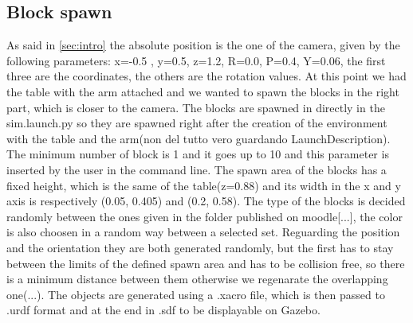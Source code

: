 \documentclass[12pt,a4paper]{article}
\begin{document}
\subsection{Block spawn}\label{subsec:blockspawn}
As said in \ref{sec:intro} the absolute position is the one of the camera, given by the following parameters: x=-0.5 , y=0.5, z=1.2, R=0.0, P=0.4, Y=0.06, the first three are the coordinates, the others are the rotation values. At this point we had the table with the arm attached and we wanted to spawn the blocks in the right part, which is closer to the camera. The blocks are spawned in directly in the sim.launch.py so they are spawned right after the creation of the environment with the table and the arm(non del tutto vero guardando LaunchDescription). The minimum number of block is 1 and it goes up to 10 and this parameter is inserted by the user in the command line. The spawn area of the blocks has a fixed height, which is the same of the table(z=0.88) and its width in the x and y axis is respectively (0.05, 0.405) and (0.2, 0.58). The type of the blocks is decided randomly between the ones given in the folder published on moodle[...], the color is also choosen in a random way between a selected set. Reguarding the position and the orientation they are both generated randomly, but the first has to stay between the limits of the defined spawn area and has to be collision free, so there is a minimum distance between them otherwise we regenarate the overlapping one(...). The objects are generated using a .xacro file, which is then passed to .urdf format and at the end in .sdf to be displayable on Gazebo. 
\end{document}

